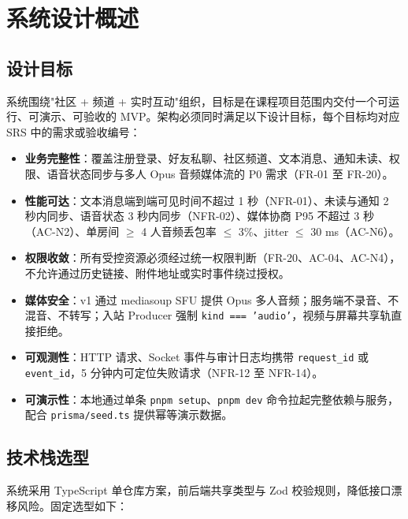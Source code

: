 \section{系统设计概述}

\subsection{设计目标}

系统围绕"社区 + 频道 + 实时互动"组织，目标是在课程项目范围内交付一个可运行、可演示、可验收的 MVP。架构必须同时满足以下设计目标，每个目标均对应 SRS 中的需求或验收编号：

\begin{itemize}
  \item \textbf{业务完整性}：覆盖注册登录、好友私聊、社区频道、文本消息、通知未读、权限、语音状态同步与多人 Opus 音频媒体流的 P0 需求（FR-01 至 FR-20）。
  \item \textbf{性能可达}：文本消息端到端可见时间不超过 1 秒（NFR-01）、未读与通知 2 秒内同步、语音状态 3 秒内同步（NFR-02）、媒体协商 P95 不超过 3 秒（AC-N2）、单房间 $\geq$ 4 人音频丢包率 $\leq$ 3\%、jitter $\leq$ 30 ms（AC-N6）。
  \item \textbf{权限收敛}：所有受控资源必须经过统一权限判断（FR-20、AC-04、AC-N4），不允许通过历史链接、附件地址或实时事件绕过授权。
  \item \textbf{媒体安全}：v1 通过 mediasoup SFU 提供 Opus 多人音频；服务端不录音、不混音、不转写；入站 Producer 强制 \texttt{kind === 'audio'}，视频与屏幕共享轨直接拒绝。
  \item \textbf{可观测性}：HTTP 请求、Socket 事件与审计日志均携带 \texttt{request\_id} 或 \texttt{event\_id}，5 分钟内可定位失败请求（NFR-12 至 NFR-14）。
  \item \textbf{可演示性}：本地通过单条 \texttt{pnpm setup}、\texttt{pnpm dev} 命令拉起完整依赖与服务，配合 \texttt{prisma/seed.ts} 提供幂等演示数据。
\end{itemize}

\subsection{技术栈选型}

系统采用 TypeScript 单仓库方案，前后端共享类型与 Zod 校验规则，降低接口漂移风险。固定选型如下：

